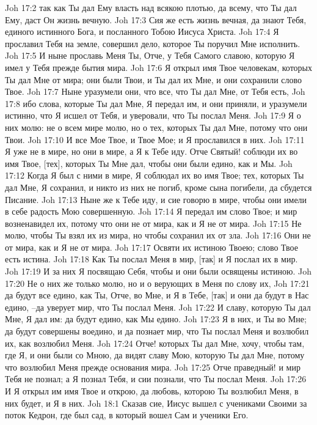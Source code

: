 Joh 17:2  так как Ты дал Ему власть над всякою плотью, да всему, что Ты дал Ему, даст Он жизнь вечную.
Joh 17:3  Сия же есть жизнь вечная, да знают Тебя, единого истинного Бога, и посланного Тобою Иисуса Христа.
Joh 17:4  Я прославил Тебя на земле, совершил дело, которое Ты поручил Мне исполнить.
Joh 17:5  И ныне прославь Меня Ты, Отче, у Тебя Самого славою, которую Я имел у Тебя прежде бытия мира.
Joh 17:6  Я открыл имя Твое человекам, которых Ты дал Мне от мира; они были Твои, и Ты дал их Мне, и они сохранили слово Твое.
Joh 17:7  Ныне уразумели они, что все, что Ты дал Мне, от Тебя есть,
Joh 17:8  ибо слова, которые Ты дал Мне, Я передал им, и они приняли, и уразумели истинно, что Я исшел от Тебя, и уверовали, что Ты послал Меня.
Joh 17:9  Я о них молю: не о всем мире молю, но о тех, которых Ты дал Мне, потому что они Твои.
Joh 17:10  И все Мое Твое, и Твое Мое; и Я прославился в них.
Joh 17:11  Я уже не в мире, но они в мире, а Я к Тебе иду. Отче Святый! соблюди их во имя Твое, [тех], которых Ты Мне дал, чтобы они были едино, как и Мы.
Joh 17:12  Когда Я был с ними в мире, Я соблюдал их во имя Твое; тех, которых Ты дал Мне, Я сохранил, и никто из них не погиб, кроме сына погибели, да сбудется Писание.
Joh 17:13  Ныне же к Тебе иду, и сие говорю в мире, чтобы они имели в себе радость Мою совершенную.
Joh 17:14  Я передал им слово Твое; и мир возненавидел их, потому что они не от мира, как и Я не от мира.
Joh 17:15  Не молю, чтобы Ты взял их из мира, но чтобы сохранил их от зла.
Joh 17:16  Они не от мира, как и Я не от мира.
Joh 17:17  Освяти их истиною Твоею; слово Твое есть истина.
Joh 17:18  Как Ты послал Меня в мир, [так] и Я послал их в мир.
Joh 17:19  И за них Я посвящаю Себя, чтобы и они были освящены истиною.
Joh 17:20  Не о них же только молю, но и о верующих в Меня по слову их,
Joh 17:21  да будут все едино, как Ты, Отче, во Мне, и Я в Тебе, [так] и они да будут в Нас едино, --да уверует мир, что Ты послал Меня.
Joh 17:22  И славу, которую Ты дал Мне, Я дал им: да будут едино, как Мы едино.
Joh 17:23  Я в них, и Ты во Мне; да будут совершены воедино, и да познает мир, что Ты послал Меня и возлюбил их, как возлюбил Меня.
Joh 17:24  Отче! которых Ты дал Мне, хочу, чтобы там, где Я, и они были со Мною, да видят славу Мою, которую Ты дал Мне, потому что возлюбил Меня прежде основания мира.
Joh 17:25  Отче праведный! и мир Тебя не познал; а Я познал Тебя, и сии познали, что Ты послал Меня.
Joh 17:26  И Я открыл им имя Твое и открою, да любовь, которою Ты возлюбил Меня, в них будет, и Я в них.
Joh 18:1  Сказав сие, Иисус вышел с учениками Своими за поток Кедрон, где был сад, в который вошел Сам и ученики Его.
